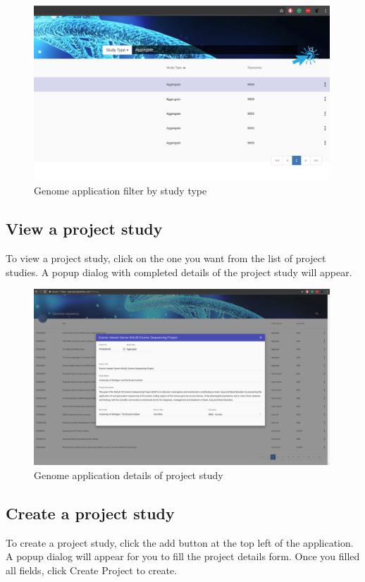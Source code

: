 \documentclass[a4paper,12pt]{article}
\begin{document}
\begin{figure}[H]
\centering
\includegraphics[width=0.99\textwidth]{images/genome-filter-studytype}
\caption{Genome application filter by study type}
\end{figure}

\subsection{View a project study}
To view a project study, click on the one you want from the list of project studies. A popup dialog with completed details of the project study will appear.

\begin{figure}[H]
\centering
\includegraphics[width=0.99\textwidth]{images/genome-details}
\caption{Genome application details of project study}
\end{figure}

\subsection{Create a project study}
To create a project study, click the add button at the top left of the application. A popup dialog will appear for you to fill the project details form. Once you filled all fields, click Create Project to create. 
\end{document}
